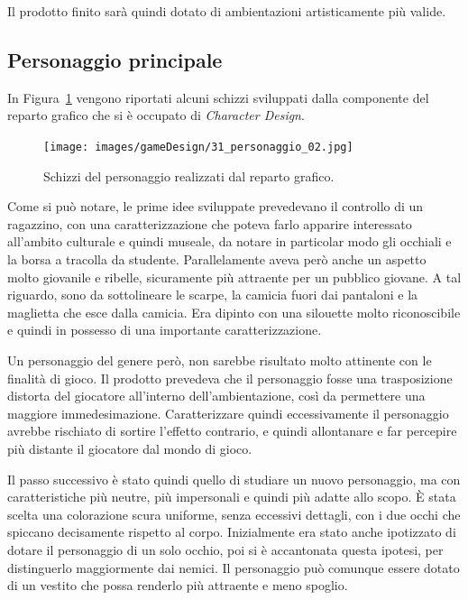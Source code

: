 Il prodotto finito sarà quindi dotato di ambientazioni artisticamente più valide.


\subsection{Personaggio principale}
\label{sec:main_character}

In Figura~\ref{fig:ambientazione_personaggio_01} vengono riportati alcuni schizzi sviluppati dalla componente del reparto grafico che si è occupato di \textit{Character Design}.

\begin{figure}%
	\centering
	\texttt{[image: images/gameDesign/31\_personaggio\_02.jpg]}
	\caption{Schizzi del personaggio realizzati dal reparto grafico.}
	\label{fig:ambientazione_personaggio_01}
\end{figure} 

Come si può notare, le prime idee sviluppate prevedevano il controllo di un ragazzino, con una caratterizzazione che poteva farlo apparire interessato all’ambito culturale e quindi museale, da notare in particolar modo gli occhiali e la borsa a tracolla da studente. Parallelamente aveva però anche un aspetto molto giovanile e ribelle, sicuramente più attraente per un pubblico giovane. A tal riguardo, sono da sottolineare le scarpe, la camicia fuori dai pantaloni e la maglietta che esce dalla camicia.
Era dipinto con una silouette molto riconoscibile e quindi in possesso di una importante caratterizzazione.

Un personaggio del genere però, non sarebbe risultato molto attinente con le finalità di gioco. Il prodotto prevedeva che il personaggio fosse una trasposizione distorta del giocatore all’interno dell’ambientazione, così da permettere una maggiore immedesimazione. Caratterizzare quindi eccessivamente il personaggio avrebbe rischiato di sortire l’effetto contrario, e quindi allontanare e far percepire più distante il giocatore dal mondo di gioco.

Il passo successivo è stato quindi quello di studiare un nuovo personaggio, ma con caratteristiche più neutre, più impersonali e quindi più adatte allo scopo.
È stata scelta una colorazione scura uniforme, senza eccessivi dettagli, con i due occhi che spiccano decisamente rispetto al corpo. Inizialmente era stato anche ipotizzato di dotare il personaggio di un solo occhio, poi si è accantonata questa ipotesi, per distinguerlo maggiormente dai nemici. Il personaggio può comunque essere dotato di un vestito che possa renderlo più attraente e meno spoglio.

